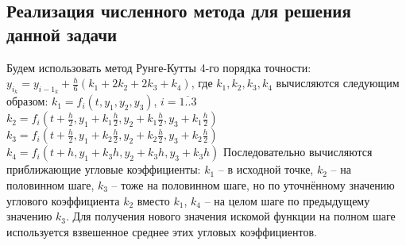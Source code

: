 \documentclass[a4paper,12pt,titlepage,finall]{article}
\begin{document}
\begin{itemize}
\section{Реализация численного метода для решения данной задачи}
Будем использовать метод Рунге-Кутты 4-го порядка точности: \newline
$y_i_k = y_{i-1}_k + \frac{h}{6}(k_1 + 2k_2 + 2k_3 + k_4)$, где $k_1, k_2, k_3, k_4$ \newline 
вычисляются следующим образом: \newline
$k_1 = f_i(t, y_1, y_2, y_3)$,   $i = \overline{1..3}$ \newline
$k_2 = f_i(t +\frac{h}{2}, y_1 + k_1 \frac{h}{2}, y_2 + k_1 \frac{h}{2}, y_3 + k_1 \frac{h}{2})$ \newline
$k_3 =f_i(t +\frac{h}{2}, y_1 + k_2\frac{h}{2}, y_2 + k_2 \frac{h}{2}, y_3 + k_2 \frac{h}{2})$ \newline
$k_4 =f_i(t +h, y_1 + k_3 h, y_2 + k_3 h, y_3 + k_3 h)$ \newline
Последовательно вычисляются приближающие угловые коэффициенты: $k_1$ – в исходной точке, $k_2$ – на половинном шаге, $k_3$ – тоже на половинном шаге, но по уточнённому значению углового коэффициента $k_2$ вместо $k_1$, $k_4$ – на целом шаге по предыдущему значению $k_3$. Для получения нового значения искомой функции на полном шаге используется взвешенное среднее этих угловых коэффициентов.
\newpage

\end{itemize}
\end{document}
